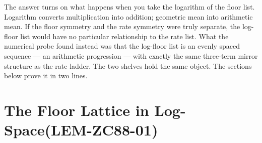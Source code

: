 \documentclass[12pt, a4paper]{article}
\begin{document}
The answer turns on what happens when you take the logarithm of the floor
list. Logarithm converts multiplication into addition; geometric mean into
arithmetic mean. If the floor symmetry and the rate symmetry were truly
separate, the log-floor list would have no particular relationship to the
rate list. What the numerical probe found instead was that the log-floor
list is an evenly spaced sequence --- an arithmetic progression --- with
exactly the same three-term mirror structure as the rate ladder. The two
shelves hold the same object. The sections below prove it in two lines.

\newpage

\section{The Floor Lattice in Log-Space\quad (LEM-ZC88-01)}
\label{sec:lem-zc88}

\end{document}
